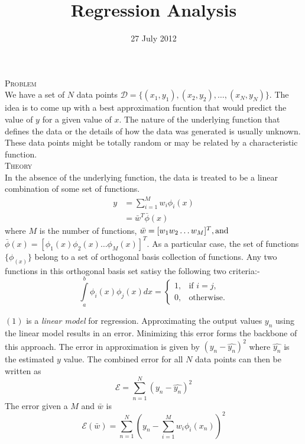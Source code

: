 \documentclass[a4paper,12pt]{article}
\title{Regression Analysis}
\author{}
\date{27 July 2012}
\begin{document}
\maketitle

\noindent \textsc{Problem} \\
We have a set of $N$ data points $\mathcal{D}=\{(x_1,y_1),(x_2,y_2),\ldots,(x_N,y_N)\}$. The idea is to come up with a best approximation fucntion that would predict the value of $y$ for a given value of $x$. The nature of the underlying function that defines the data or the details of how the data was generated is usually unknown. These data points might be totally random or may be related by a characteristic function. \\

\noindent \textsc{Theory} \\
In the absence of the underlying function, the data is treated to be a linear combination of some set of functions.
\begin{align}
y &=  \sum_{i=1}^M w_i \phi_i(x) \\
  &=  \bar{w}^T \bar{\phi}(x)
\end{align}
where $M$ is the number of functions, 
$\bar{w} = [w_1 w_2 \ldots w_M]^T, \rm{and}$
$\bar{\phi}(x) = [\phi_1(x) \phi_2(x) \ldots \phi_M(x)]^T$.
As a particular case, the set of functions $\{\phi_(x)\}$ belong to a set of orthogonal basis collection of functions. Any two functions in this orthogonal basis set satisy the following two criteria:-
\[ 
  \int\limits_{a}^{b}\phi_i(x)\phi_j(x) dx =  
  \begin{cases}
    1, & \text{if } i = j, \\
    0, & \text{otherwise}.
  \end{cases}
\]

\noindent $(1)$ is a \textit{linear model} for regression. Approximating the output values ${y_n}$ using the linear model results in an error. Minimizing this error forms the backbone of this approach. The error in approximation is given by $(y_n-\hat{y_n})^2$ where $\hat{y_n}$ is the estimated $y$ value. The combined error for all $N$ data points can then be written as
\begin{equation}
 \mathcal{E} = \sum_{n=1}^N (y_n-\hat{y_n})^2
\end{equation} 
The error given a $M$ and $\bar{w}$ is 
\begin{equation}
 \mathcal{E}(\bar{w}) = \sum_{n=1}^N (y_n-\sum_{i=1}^M w_i \phi_i(x_n))^2
\end{equation} 
\end{document}
